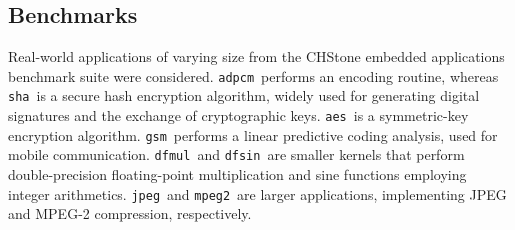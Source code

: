 \documentclass[]{usiinfthesis}
\newcommand{\adpcm}{\texttt{adpcm}}
\newcommand{\sha}{\texttt{sha}}
\newcommand{\jpeg}{\texttt{jpeg}}
\newcommand{\mpeg}{\texttt{mpeg2}}
\newcommand{\aes}{\texttt{aes}}
\newcommand{\dfmul}{\texttt{dfmul}}
\newcommand{\dfsin}{\texttt{dfsin}}
\newcommand{\gsm}{\texttt{gsm}}
\begin{document}
\subsection{Benchmarks}
\label{subsec:benchmarks}
\vspace{.3cm}


Real-world applications of varying size from the CHStone
embedded applications benchmark suite \cite{HaraMay08} were considered. 
\adpcm\ performs an encoding routine, whereas \sha\ is a secure hash
encryption algorithm, widely used for generating digital signatures
and the exchange of cryptographic keys. \aes\ is a symmetric-key
encryption algorithm. \gsm\ performs a linear predictive coding
analysis, used for mobile communication.  \dfmul\ and \dfsin\ are
smaller kernels that perform double-precision floating-point
multiplication and sine functions employing integer arithmetics.
\jpeg\ and \mpeg\ are larger applications, implementing JPEG and
MPEG-2 compression, respectively.  



\end{document}
